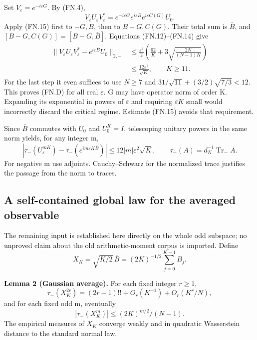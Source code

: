 Set \(V_\varepsilon=e^{-i\varepsilon G}\). By (FN.4), \[
 V_\varepsilon U_\varepsilon V_\varepsilon^*
 =e^{-i\varepsilon G}e^{i\varepsilon B}
       e^{i\varepsilon C(G)}U_0.
\] Apply (FN.15) first to \(-G,B\), then to \(B-G,C(G)\). Their total sum is \(\bar B\), and \([B-G,C(G)]=[B-G,\bar B]\). Equations (FN.12)--(FN.14) give \[
 \begin{split}
 \|V_\varepsilon U_\varepsilon V_\varepsilon^*
       -e^{i\varepsilon\overline B}U_0\|_{2,-}
 &\leq\frac{\varepsilon^2}{2}
   \left(\frac{62}{K}+3\sqrt{\frac{2N}{(N-1)K}}\right)\\
 &\leq\frac{12\varepsilon^2}{\sqrt K},\qquad K\geq11.
 \end{split}\tag{FN.16}
\] For the last step it even suffices to use \(N\geq7\) and \(31/\sqrt{11}+(3/2)\sqrt{7/3}<12\). This proves (FN.D) for all real \(\varepsilon\). G may have operator norm of order K. Expanding its exponential in powers of \(\varepsilon\) and requiring \(\varepsilon K\) small would incorrectly discard the critical regime. Estimate (FN.15) avoids that requirement.

Since \(\bar B\) commutes with \(U_{0}\) and \(U_0^K=I\), telescoping unitary powers in the same norm yields, for any integer m, \[
 \left|\tau_-(U_\varepsilon^{mK})
       -\tau_-(e^{im\varepsilon K\overline B})\right|
 \leq12|m|\varepsilon^2\sqrt K,\qquad
 \tau_-(A)=d_N^{-1}\operatorname{Tr}_{-}A.                      \tag{FN.17}
\] For negative m use adjoints. Cauchy--Schwarz for the normalized trace justifies the passage from the norm to traces.

\subsection{A self-contained global law for the averaged observable}\label{floquet:a-self-contained-global-law-for-the-averaged-observable}

The remaining input is established here directly on the whole odd subspace; no unproved claim about the old arithmetic-moment corpus is imported. Define \[
 X_K=\sqrt{K/2}\,\overline B=(2K)^{-1/2}\sum_{j=0}^{K-1}B_j.
\]

\textbf{Lemma 2 (Gaussian average).} For each fixed integer \(r\geq1\), \[
 \tau_-(X_K^{2r})=(2r-1)!!+O_r(K^{-1})+O_r(K^r/N),               \tag{FN.18}
\] and for each fixed odd m, eventually \[
 |\tau_-(X_K^m)|\leq (2K)^{m/2}/(N-1).                         \tag{FN.19}
\] The empirical measures of \(X_{K}\) converge weakly and in quadratic Wasserstein distance to the standard normal law.

